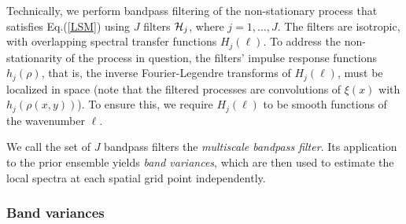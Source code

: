 \documentclass[12pt]{article}
\begin{document}
Technically, we perform bandpass filtering of the non-stationary process
that satisfies Eq.(\ref{LSM})  using $J$  filters ${\cal H}_j$, where $j=1,\dots,J$.
The filters are isotropic, with overlapping spectral transfer functions $H_j(\ell)$.
To address the non-stationarity of the process in question, the filters' impulse response functions $h_j(\rho)$,
that is, the inverse Fourier-Legendre transforms of $H_j(\ell)$, must be localized in space
(note that the filtered processes are convolutions of $\xi(x)$ with $h_j(\rho(x,y))$).
To ensure this, we require  $H_j(\ell)$ to be smooth functions of the wavenumber $\ell$.

We call the set of $J$ bandpass filters the {\em  multiscale bandpass filter}.
Its  application to the prior ensemble yields {\em band variances},
which are then used to estimate the local spectra at each spatial grid point independently.





\subsubsection{Band variances}
\label{sec_def_bands}
\end{document}
